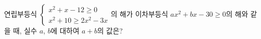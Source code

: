 연립부등식 $\begin{cases} x^2+x-12\ge 0 \\ x^2+10\ge 2x^2-3x \end{cases}$의 해가 이차부등식 $ax^2+bx-30\ge 0$의 해와 같을 때, 실수 $a$, $b$에 대하여 $a+b$의 값은?
